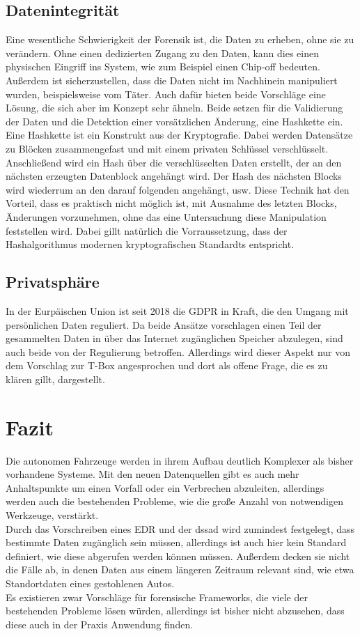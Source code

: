 \documentclass[conference,compsoc,final,a4paper]{IEEEtran}
\begin{document}
\subsection{Datenintegrität}

Eine wesentliche Schwierigkeit der Forensik ist, die Daten zu erheben, ohne sie zu verändern. Ohne einen dedizierten Zugang
zu den Daten, kann dies einen physischen Eingriff ins System, wie zum Beispiel einen Chip-off bedeuten.
Außerdem ist sicherzustellen, dass die Daten nicht im Nachhinein manipuliert wurden, beispielsweise vom Täter.
Auch dafür bieten beide Vorschläge eine Lösung, die sich aber im Konzept sehr ähneln.
Beide setzen für die Validierung der Daten und die Detektion einer vorsätzlichen Änderung, eine Hashkette ein.\\
Eine Hashkette ist ein Konstrukt aus der Kryptografie.
Dabei werden Datensätze zu Blöcken zusammengefast und mit einem privaten Schlüssel verschlüsselt.
Anschließend wird ein Hash über die verschlüsselten Daten erstellt, der an den nächsten erzeugten Datenblock angehängt wird.
Der Hash des nächsten Blocks wird wiederrum an den darauf folgenden angehängt, usw.
Diese Technik hat den Vorteil, dass es praktisch nicht möglich ist, mit Ausnahme des letzten Blocks, Änderungen vorzunehmen, ohne das eine
Untersuchung diese Manipulation feststellen wird. 
Dabei gillt natürlich die Vorraussetzung, dass der Hashalgorithmus modernen kryptografischen Standardts entspricht.

\subsection{Privatsphäre}
In der Eurpäischen Union ist seit 2018 die \ac{GDPR} in Kraft, die den Umgang mit persönlichen Daten
reguliert. Da beide Ansätze vorschlagen einen Teil der gesammelten Daten in über das Internet zugänglichen Speicher
abzulegen, sind auch beide von der Regulierung betroffen. Allerdings wird dieser Aspekt nur von dem Vorschlag zur T-Box angesprochen und dort als
offene Frage, die es zu klären gillt, dargestellt.~\cite{Lee_2019}

\section{Fazit}

Die autonomen Fahrzeuge werden in ihrem Aufbau deutlich Komplexer als bisher vorhandene Systeme.
Mit den neuen Datenquellen gibt es auch mehr Anhaltspunkte um einen Vorfall oder ein Verbrechen
abzuleiten, allerdings werden auch die bestehenden Probleme, wie die große Anzahl von notwendigen Werkzeuge, verstärkt.\\
Durch das Vorschreiben eines \ac{EDR} und der \ac{dssad} wird zumindest festgelegt, dass bestimmte Daten zugänglich sein müssen,
allerdings ist auch hier kein Standard definiert, wie diese abgerufen werden können müssen.
Außerdem decken sie nicht die Fälle ab, in denen Daten aus einem längeren Zeitraum relevant sind, wie etwa Standortdaten eines gestohlenen Autos.\\
Es existieren zwar Vorschläge für forensische Frameworks, die viele der bestehenden Probleme lösen würden, allerdings ist bisher nicht abzusehen, dass diese auch in der Praxis Anwendung finden.
\end{document}
